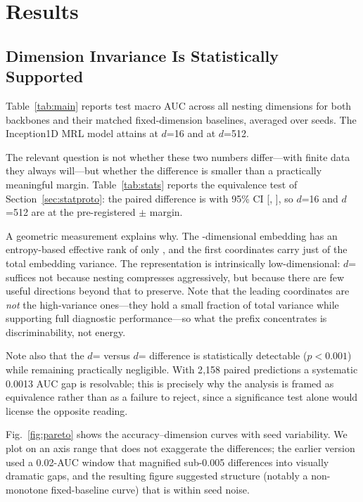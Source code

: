 \section{Results}

\subsection{Dimension Invariance Is Statistically Supported}

Table~\ref{tab:main} reports test macro AUC across all nesting dimensions for
both backbones and their matched fixed-dimension baselines, averaged over
 seeds. The Inception1D MRL model attains  at
$d$=16 and  at $d$=512.



The relevant question is not whether these two numbers differ---with finite
data they always will---but whether the difference is smaller than a
practically meaningful margin. Table~\ref{tab:stats} reports the equivalence
test of Section~\ref{sec:statproto}: the paired difference is 
with 95\% CI [, ], so $d$=16 and $d$=512 are
 at the pre-registered $\pm$ margin.



A geometric measurement explains why. The -dimensional
embedding has an entropy-based effective rank of only , and the
first  coordinates carry just  of the total
embedding variance. The representation is intrinsically low-dimensional:
$d$= suffices not because nesting compresses aggressively, but
because there are few useful directions beyond that to preserve. Note that the
leading coordinates are \emph{not} the high-variance ones---they hold a small
fraction of total variance while supporting full diagnostic performance---so
what the prefix concentrates is discriminability, not energy.

Note also that the $d$= versus $d$= difference is
statistically detectable ($p<0.001$) while remaining practically negligible.
With 2{,}158 paired predictions a systematic 0.0013 AUC gap is resolvable;
this is precisely why the analysis is framed as equivalence rather than as a
failure to reject, since a significance test alone would license the opposite
reading.

Fig.~\ref{fig:pareto} shows the accuracy--dimension curves with seed
variability. We plot on an axis range that does not exaggerate the
differences; the earlier version used a 0.02-AUC window that magnified
sub-0.005 differences into visually dramatic gaps, and the resulting figure
suggested structure (notably a non-monotone fixed-baseline curve) that is
within seed noise.


